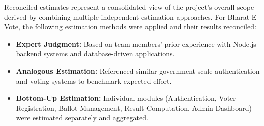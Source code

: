 \documentclass[oneside,a4paper,12pt]{book}
\begin{document}
Reconciled estimates represent a consolidated view of the project's overall scope derived by combining multiple independent estimation approaches. For Bharat E-Vote, the following estimation methods were applied and their results reconciled:
\begin{itemize}[leftmargin=1.5cm]
    \item \textbf{Expert Judgment:} Based on team members' prior experience with Node.js backend systems and database-driven applications.
    \item \textbf{Analogous Estimation:} Referenced similar government-scale authentication and voting systems to benchmark expected effort.
    \item \textbf{Bottom-Up Estimation:} Individual modules (Authentication, Voter Registration, Ballot Management, Result Computation, Admin Dashboard) were estimated separately and aggregated.
\end{itemize}
\end{document}
